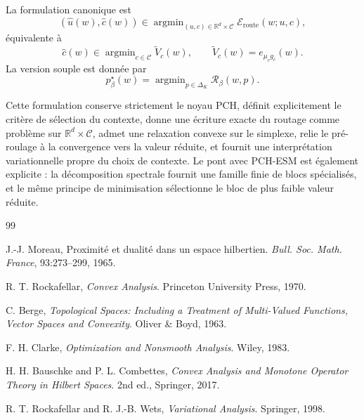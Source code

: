 \documentclass[11pt,a4paper]{article}
\DeclareMathOperator{\argmin}{argmin}
\newcommand{\R}{\mathbb R}
\newcommand{\Ccal}{\mathcal C}
\newcommand{\Rcal}{\mathcal R}
\begin{document}
La formulation canonique est
\[
(\hat u(w),\hat c(w))\in\argmin_{(u,c)\in\R^d\times\Ccal}\mathcal E_{\mathrm{route}}(w;u,c),
\]
équivalente à
\[
\hat c(w)\in\argmin_{c\in\Ccal}\widetilde V_c(w),
\qquad
\widetilde V_c(w)=e_{\mu_c g_c}(w).
\]
La version souple est donnée par
\[
p^\star_\beta(w)=\argmin_{p\in\Delta_K}\Rcal_\beta(w,p).
\]

Cette formulation conserve strictement le noyau PCH, définit explicitement le critère de sélection du contexte, donne une écriture exacte du routage comme problème sur \(\R^d\times\Ccal\), admet une relaxation convexe sur le simplexe, relie le pré-roulage à la convergence vers la valeur réduite, et fournit une interprétation variationnelle propre du choix de contexte. Le pont avec PCH-ESM est également explicite : la décomposition spectrale fournit une famille finie de blocs spécialisés, et le même principe de minimisation sélectionne le bloc de plus faible valeur réduite.

\begin{thebibliography}{99}

J.-J. Moreau,
\newblock Proximité et dualité dans un espace hilbertien.
\newblock \emph{Bull. Soc. Math. France}, 93:273--299, 1965.

R. T. Rockafellar,
\newblock \emph{Convex Analysis}.
\newblock Princeton University Press, 1970.

C. Berge,
\newblock \emph{Topological Spaces: Including a Treatment of Multi-Valued Functions, Vector Spaces and Convexity}.
\newblock Oliver \& Boyd, 1963.

F. H. Clarke,
\newblock \emph{Optimization and Nonsmooth Analysis}.
\newblock Wiley, 1983.

H. H. Bauschke and P. L. Combettes,
\newblock \emph{Convex Analysis and Monotone Operator Theory in Hilbert Spaces}.
\newblock 2nd ed., Springer, 2017.

R. T. Rockafellar and R. J.-B. Wets,
\newblock \emph{Variational Analysis}.
\newblock Springer, 1998.

\end{thebibliography}
\end{document}
